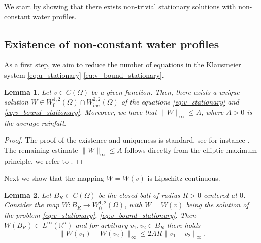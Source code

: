 \documentclass[11pt, a4paper]{article}
\theoremstyle{break}
\theoremstyle{break}
\theoremstyle{break}
\theoremstyle{break}
\theoremstyle{break}
\newtheorem{lem}{Lemma}[section]
\theoremstyle{break}
\theoremstyle{break}
\theoremstyle{break}
\theoremstyle{break}
\begin{document}
We start by showing that there exists non-trivial stationary solutions with non-constant water profiles. 

\subsection{Existence of non-constant water profiles}

As a first step, we aim to reduce the number of equations in the Klausmeier system \eqref{eq:u_stationary}-\eqref{eq:v_bound_stationary}. 
 
\begin{lem}
    \label{lem:existence_of_inhomogeneous_elliptic_v}
    Let $v \in C(\Omega)$ be a given function. Then, there exists a unique solution $W \in W^{1,2}_0(\Omega) \cap W^{2,2}_{loc}(\Omega)$ of the equations \eqref{eq:v_stationary} and \eqref{eq:v_bound_stationary}. Moreover, we have that $\|W \|_\infty \leq A$, where $A >0 $ is the average rainfall. 
\end{lem}
\begin{proof}
    The proof of the existence and uniqueness is standard, see for instance \cite[Theorem 8.9]{gilbarg2001elliptic}. The remaining  estimate $\|W\|_\infty \leq A$ follows directly from the elliptic maximum principle, we refer to \cite[Chapter 3]{gilbarg2001elliptic}.
\end{proof}

Next we show that the mapping $W = W(v)$ is Lipschitz continuous.
\begin{lem}
    \label{lem:stationary_v_lipschitz_constant}
    Let $B_R \subset C(\Omega)$ be the closed ball of radius $R > 0$ centered at $0$. 
    Consider the map $W : B_R \rightarrow W^{1,2}_0(\Omega)$, with $W=W(v)$ being the solution of the problem \eqref{eq:v_stationary}, \eqref{eq:v_bound_stationary}. Then $W (B_R) \subset L^\infty(\mathbb{R}^n)$ and for arbitrary $v_1, v_2 \in B_R$ there holds
    \begin{equation}
        \|W(v_1) - W(v_2)\|_\infty \leq 2 A R \|v_1 - v_2\|_\infty.
    \end{equation}
\end{lem}
\end{document}
